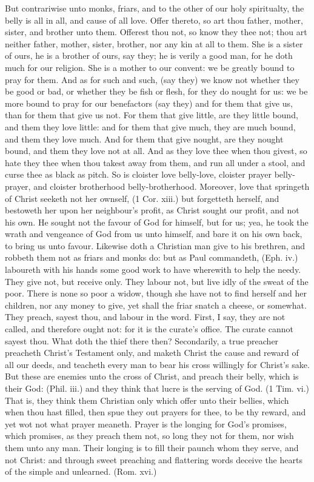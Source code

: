 But contrariwise unto monks, friars, and to the other of 
our holy spiritualty, the belly is all in all, and cause of all 
love. Offer thereto, so art thou father, mother, sister, and 
brother unto them. Offerest thou not, so know they thee 
not; thou art neither father, mother, sister, brother, nor 
any kin at all to them. She is a sister of ours, he is a 
brother of ours, say they; he is verily a good man, for he 
doth much for our religion. She is a mother to our convent:
we be greatly bound to pray for them. And as for 
such and such, (say they) we know not whether they be 
good or bad, or whether they be fish or flesh, for they do 
nought for us: we be more bound to pray for our benefactors
(say they) and for them that give us, than for them 
that give us not. For them that give little, are they little 
bound, and them they love little: and for them that give 
much, they are much bound, and them they love much. 
And for them that give nought, are they nought bound, 
and them they love not at all. And as they love thee 
when thou givest, so hate they thee when thou takest 
away from them, and run all under a stool, and curse thee 
as black as pitch. So is cloister love belly-love, cloister 
prayer belly-prayer, and cloister brotherhood belly-brotherhood.
Moreover, love that springeth of Christ seeketh 
not her ownself, (1 Cor. xiii.) but forgetteth herself, and 
bestoweth her upon her neighbour's profit, as Christ sought 
our profit, and not his own. He sought not the favour of 
God for himself, but for us; yea, he took the wrath and 
vengeance of God from us unto himself, and bare it on his 
own back, to bring us unto favour. Likewise doth a 
Christian man give to his brethren, and robbeth them not 
as friars and monks do: but as Paul commandeth, 
(Eph. iv.) laboureth with his hands some good work to have 
wherewith to help the needy. They give not, but receive 
only. They labour not, but live idly of the sweat of the 
poor. There is none so poor a widow, though she have 
not to find herself and her children, nor any money to give, 
yet shall the friar snatch a cheese, or somewhat. They 
preach, sayest thou, and labour in the word. First, I say, 
they are not called, and therefore ought not: for it is the 
curate's office. The curate cannot sayest thou. What 
doth the thief there then? Secondarily, a true preacher 
preacheth Christ's Testament only, and maketh Christ the 
cause and reward of all our deeds, and teacheth every man 
to bear his cross willingly for Christ's sake. But these 
are enemies unto the cross of Christ, and preach their 
belly, which is their God: (Phil. iii.) and they think that 
lucre is the serving of God. (1 Tim. vi.) That is, they 
think them Christian only which offer unto their bellies, 
which when thou hast filled, then spue they out prayers 
for thee, to be thy reward, and yet wot not what prayer
meaneth. Prayer is the longing for God's promises, 
which promises, as they preach them not, so long they not 
for them, nor wish them unto any man. Their longing is 
to fill their paunch whom they serve, and not Christ: and 
through sweet preaching and flattering words deceive the 
hearts of the simple and unlearned. (Rom. xvi.) 

